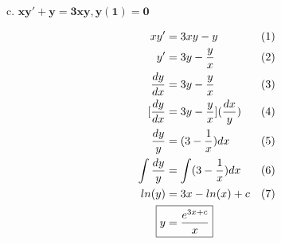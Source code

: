 \documentclass{article}
\begin{document}
\begin{flushleft}
        \hspace{10mm} c. $
            \boldsymbol{ xy' + y = 3xy , y(1) = 0}
            $  \break

            \begin{align*}
                xy' & = 3xy - y  && \text{(1)}\\
                y' & = 3y - \frac{y}{x}  && \text{(2)}\\
                \frac{dy}{dx} & = 3y - \frac{y}{x}  && \text{(3)}\\
                [ \frac{dy}{dx} & = 3y - \frac{y}{x} ] (\frac{dx}{y})  && \text{(4)}\\
                \frac{dy}{y} & = (3 - \frac{1}{x})dx  && \text{(5)}\\
                \int \frac{dy}{y} & = \int (3 - \frac{1}{x})dx  && \text{(6)}\\
                ln(y) & = 3x - ln(x) + c  && \text{(7)}\\
                \Aboxed{y & = \frac{e^{3x + c}}{x}}\\
            \end{align*}
    \end{flushleft}
\end{document}
